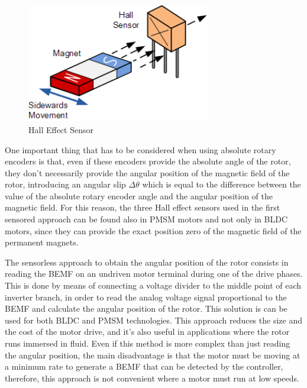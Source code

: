 \begin{figure}[htbp]
\centering
\includegraphics[width=8cm]{Images/hall_effect.png} 
\caption[Hall Effect Sensor]{Hall Effect Sensor}
\label{fig:hall_effect}
\end{figure}

One important thing that has to be considered when using absolute rotary encoders is that, even if these encoders provide the absolute angle of the rotor, they don't necessarily provide the angular position of the magnetic field of the rotor, introducing an angular slip $\Delta \theta$ which is equal to the difference between the value of the absolute rotary encoder angle and the angular position of the magnetic field. For this reason, the three Hall effect sensors used in the first sensored approach can be found also in \ac{PMSM} motors and not only in \ac{BLDC} motors, since they can provide the exact position zero of the magnetic field of the permanent magnets.

The sensorless approach to obtain the angular position of the rotor consists in reading the \ac{BEMF} on an undriven motor terminal during one of the drive phases. This is done by means of connecting a voltage divider to the middle point of each inverter branch, in order to read the analog voltage signal proportional to the \ac{BEMF} and calculate the angular position of the rotor. This solution is can be used for both \ac{BLDC} and \ac{PMSM} technologies. This approach reduces the size and the cost of the motor drive, and it's also useful in applications where the rotor runs immersed in fluid. Even if this method is more complex than just reading the angular position, the main disadvantage is that the motor must be moving at a minimum rate to generate a \ac{BEMF} that can be detected by the controller, therefore, this approach is not convenient where a motor must run at low speeds.

